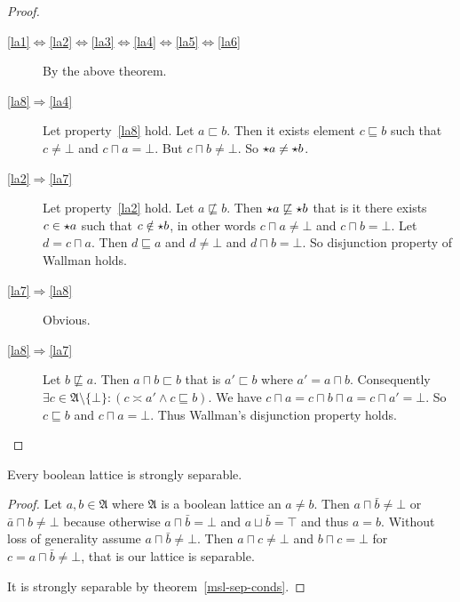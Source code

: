 \begin{proof}
~
\begin{description}
\item [{\ref{la1}$\Leftrightarrow$\ref{la2}$\Leftrightarrow$\ref{la3}$\Leftrightarrow$\ref{la4}$\Leftrightarrow$\ref{la5}$\Leftrightarrow$\ref{la6}}] By
the above theorem.
\item [{\ref{la8}$\Rightarrow$\ref{la4}}] Let property~\ref{la8} hold.
Let $a\sqsubset b$. Then it exists element $c\sqsubseteq b$ such
that $c\neq\bot$ and $c\sqcap a=\bot$. But $c\sqcap b\neq\bot$.
So $\star a\neq\star b$.
\item [{\ref{la2}$\Rightarrow$\ref{la7}}] Let property~\ref{la2} hold.
Let $a\nsqsubseteq b$. Then $\star a\not\sqsubseteq\star b$
that is it there exists $c\in\star a$ such that $c\notin\star b$,
in other words $c\sqcap a\neq\bot$ and $c\sqcap b=\bot$. Let $d=c\sqcap a$.
Then $d\sqsubseteq a$ and $d\neq\bot$ and $d\sqcap b=\bot$. So
disjunction property of Wallman holds.
\item [{\ref{la7}$\Rightarrow$\ref{la8}}] Obvious.
\item [{\ref{la8}$\Rightarrow$\ref{la7}}] Let $b\nsqsubseteq a$. Then
$a\sqcap b\sqsubset b$ that is $a'\sqsubset b$ where $a'=a\sqcap b$.
Consequently $\exists c\in\mathfrak{A}\setminus\{\bot\}:(c\asymp a'\land c\sqsubseteq b)$.
We have $c\sqcap a=c\sqcap b\sqcap a=c\sqcap a'=\bot$. So $c\sqsubseteq b$
and $c\sqcap a=\bot$. Thus Wallman's disjunction property holds.
\end{description}
\end{proof}
\begin{prop}\label{bool-sep}
Every boolean lattice is strongly separable.\end{prop}
\begin{proof}
Let $a,b\in\mathfrak{A}$ where $\mathfrak{A}$ is a boolean lattice
an $a\neq b$. Then $a\sqcap\bar{b}\neq\bot$ or $\bar{a}\sqcap b\neq\bot$
because otherwise $a\sqcap\bar{b}=\bot$ and $a\sqcup\bar{b}=\top$
and thus $a=b$. Without loss of generality assume $a\sqcap\bar{b}\neq\bot$.
Then $a\sqcap c\neq\bot$ and $b\sqcap c=\bot$ for $c=a\sqcap\bar{b}\neq\bot$,
that is our lattice is separable.

It is strongly separable by theorem~\ref{msl-sep-conds}.
\end{proof}


